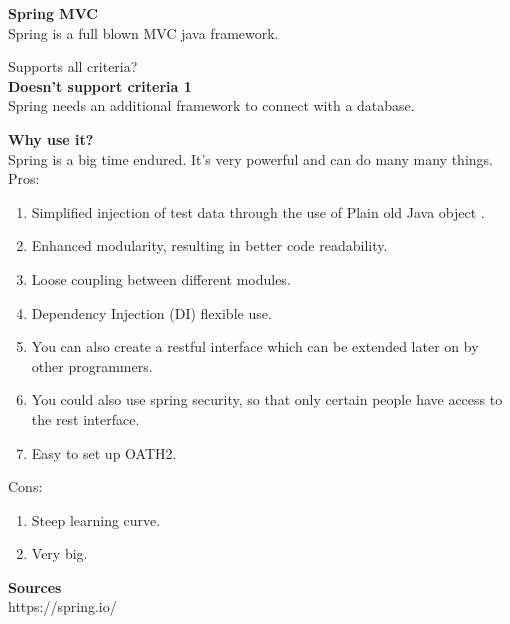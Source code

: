 \textbf{Spring MVC} \\
Spring is a full blown MVC java framework.

Supports all criteria? \\
\textbf{Doesn't support criteria 1}\\
Spring needs an additional framework  to connect with a database.

\textbf{Why use it?}\\
Spring is a big time endured. It's very powerful and can do many many things.\\

Pros:
\begin{enumerate}
	\item Simplified injection of test data through the use of Plain old Java object .
	\item Enhanced modularity, resulting in better code readability.
	\item Loose coupling between different modules.
	\item Dependency Injection (DI) flexible use.
	\item You can also create a restful interface which can be extended later on by other programmers.
	\item You could also use spring security, so that only certain people have access to the rest interface.
	\item Easy to set up OATH2. 
\end{enumerate}
Cons:
\begin{enumerate}
	\item Steep learning curve.
	\item Very big.
\end{enumerate}

\textbf{Sources}\\
https://spring.io/